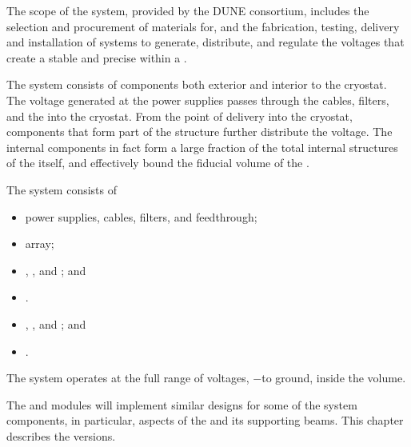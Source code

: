 
The scope of the \single {} system, provided by the DUNE  consortium, includes the selection and procurement of materials for, and the fabrication, testing, delivery and installation of systems to generate, distribute, and regulate the voltages that
create a stable and precise \efield{} within a . 

The  system consists of components both exterior and interior to the cryostat. The voltage generated at the  power supplies passes through the cables, filters, and the  \fdth into the cryostat. From the point of delivery into the cryostat, components that form part of the  structure further distribute the voltage. The internal  components in fact form a large fraction of the total internal structures of the  itself, and  
 effectively bound the  fiducial volume of the %
 . %

The   system consists of
\begin{itemize}
\item {} power supplies, cables, filters, and feedthrough;
\item {} array;
\item {}, , and ; and
\item {}.
\end{itemize}

\begin{itemize}
\item {}, , and ; and
\item {}.
\end{itemize}

The system operates at the full range of voltages, %
$-$\sptargetdriftvoltpos to ground, inside the  volume. 

The   and   modules will implement similar designs for some
 of the  system components, %
 in particular, aspects of the  and its supporting beams. This chapter describes the   versions. 
 
